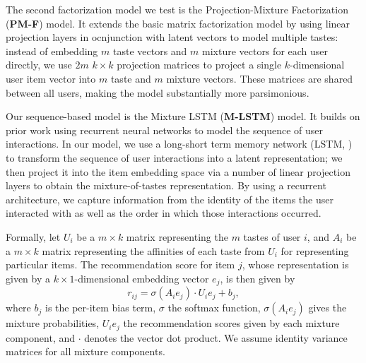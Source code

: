 \documentclass[sigconf]{acmart}
\begin{document}
The second factorization model we test is the Projection-Mixture Factorization (\textbf{PM-F}) model. It extends the basic matrix factorization model by using linear projection layers in ocnjunction with latent vectors to model multiple tastes: instead of embedding $m$ taste vectors and $m$ mixture vectors for each user directly, we use $2m$ $k \times k$ projection matrices to project a single $k$-dimensional user item vector into $m$ taste and $m$ mixture vectors. These matrices are shared between all users, making the model substantially more parsimonious.

Our sequence-based model is the Mixture LSTM (\textbf{M-LSTM}) model. It builds on prior work \citep{wu2017recurrent, hidasi2015session} using recurrent neural networks to model the sequence of user interactions. In our model, we use a long-short term memory network (LSTM, \cite{hochreiter1997long}) to transform the sequence of user interactions into a latent representation; we then project it into the item embedding space via a number of linear projection layers to obtain the mixture-of-tastes representation. By using a recurrent architecture, we capture information from the identity of the items the user interacted with as well as the order in which those interactions occurred.

Formally, let $U_i$ be a $m \times k$ matrix representing the $m$ tastes of user $i$, and $A_i$ be a $m \times k$ matrix representing the affinities of each taste from $U_i$ for representing particular items. The recommendation score for item $j$, whose representation is given by a $k \times 1$-dimensional embedding vector $e_j$, is then given by
\begin{equation}
  r_{ij} = \sigma\left(A_ie_j\right) \cdot U_ie_j + b_j,
\end{equation}
where $b_j$ is the per-item bias term, $\sigma$ the softmax function, $\sigma\left(A_ie_j\right)$ gives the mixture probabilities, $U_ie_j$ the recommendation scores given by each mixture component, and $\cdot$ denotes the vector dot product. We assume identity variance matrices for all mixture components.
\end{document}
